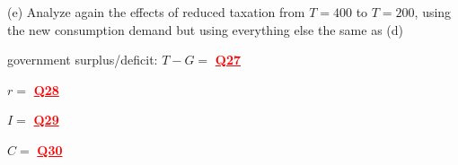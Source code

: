 \documentclass[14pt]{extarticle}
\newcommand{\red}[1]{\textcolor{red}{#1}}
\begin{document}
(e) Analyze again the effects of reduced taxation from $ T = 400 $ to $ T = 200 $, using the new consumption demand but using everything else the same as (d)

\begin{center}
    government surplus/deficit: $ T - G = $ \textbf{\red{\underline{\quad Q27 \quad}}}

    $ r =  $   \textbf{\red{\underline{\quad Q28 \quad}}}

    $ I =  $   \textbf{\red{\underline{\quad Q29 \quad}}}

    $ C =  $   \textbf{\red{\underline{\quad Q30 \quad}}}
\end{center}
\end{document}
